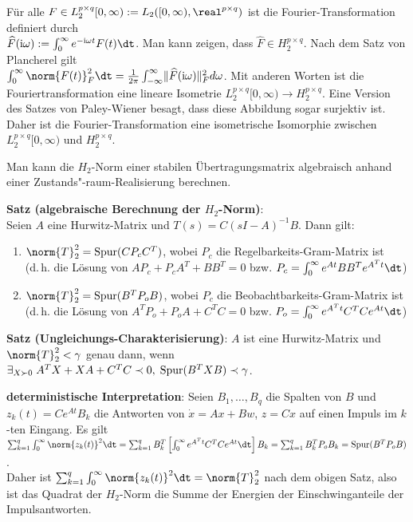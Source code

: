 Für alle $F \in L_2^{p \times q}[0, \infty) := L_2([0, \infty), \real^{p \times q})$ ist die
Fourier-Transformation definiert durch\\
$\widehat{F}(\iu\omega) := \int_0^\infty e^{-\iu\omega t} F(t)\dt$.
Man kann zeigen, dass $\widehat{F} \in H_2^{p \times q}$.
Nach dem Satz von Plancherel gilt\\
$\int_0^\infty \norm{F(t)}_F^2 \dt =
\frac{1}{2\pi} \int_{-\infty}^\infty \lVert\widehat{F}(\iu\omega)\rVert_F^2 d\omega$.
Mit anderen Worten ist die Fouriertransformation eine lineare Isometrie
$L_2^{p \times q}[0, \infty) \rightarrow H_2^{p \times q}$.
Eine Version des Satzes von Paley-Wiener besagt, dass diese Abbildung sogar surjektiv ist.
Daher ist die Fourier-Transformation eine isometrische Isomorphie zwischen
$L_2^{p \times q}[0, \infty)$ und $H_2^{p \times q}$.

\linie

Man kann die $H_2$-Norm einer stabilen Übertragungsmatrix algebraisch anhand einer
Zustands"-raum-Realisierung berechnen.

\textbf{Satz (algebraische Berechnung der $H_2$-Norm)}:\\
Seien $A$ eine Hurwitz-Matrix und $T(s) = C(sI - A)^{-1}B$.
Dann gilt:
\begin{enumerate}
    \item
    $\norm{T}_2^2 = \Spur(C P_c C^T)$, wobei
    $P_c$ die Regelbarkeits-Gram-Matrix ist\\
    (d.\,h. die Lösung von $AP_c + P_c A^T + BB^T = 0$
    bzw. $P_c = \int_0^\infty e^{At} B B^T e^{A^T t} \dt$)

    \item
    $\norm{T}_2^2 = \Spur(B^T P_o B)$, wobei
    $P_c$ die Beobachtbarkeits-Gram-Matrix ist\\
    (d.\,h. die Lösung von $A^T P_o + P_o A + C^T C = 0$
    bzw. $P_o = \int_0^\infty e^{A^T t} C^T C e^{At} \dt$)
\end{enumerate}

\textbf{Satz (Ungleichungs-Charakterisierung)}:
$A$ ist eine Hurwitz-Matrix und $\norm{T}_2^2 < \gamma$ genau dann, wenn
$\exists_{X \succ 0}\; A^T X + XA + C^T C \prec 0,\; \operatorname{Spur}(B^T X B) \prec \gamma$.

\linie

\textbf{deterministische Interpretation}:
Seien $B_1, \dotsc, B_q$ die Spalten von $B$ und $z_k(t) = Ce^{At} B_k$ die Antworten
von $\dot{x} = Ax + Bw$, $z = Cx$ auf einen Impuls im $k$-ten Eingang.
Es gilt
$\sum_{k=1}^q \int_0^\infty \norm{z_k(t)}^2 \dt
= \sum_{k=1}^q B_k^T \left[\int_0^\infty e^{A^T t} C^T C e^{At} \dt\right] B_k
= \sum_{k=1}^q B_k^T P_o B_k
= \Spur(B^T P_o B)$.\\
Daher ist $\sum_{k=1}^q \int_0^\infty \norm{z_k(t)}^2 \dt = \norm{T}_2^2$ nach dem obigen Satz,
also ist das Quadrat der
$H_2$-Norm die Summe der Energien der Einschwinganteile der Impulsantworten.

